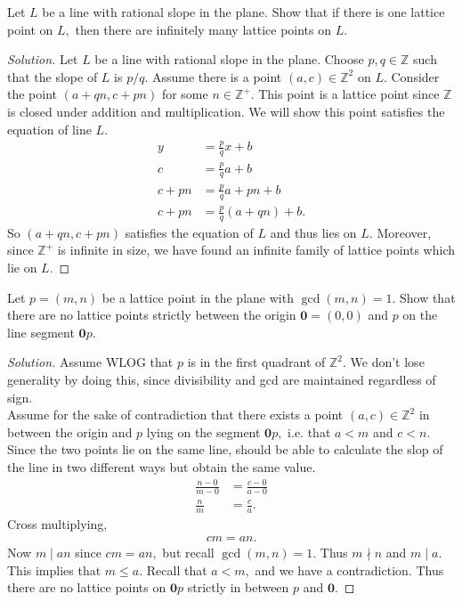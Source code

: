 \documentclass[12pt]{article}
\newcommand{\Z}{\mathbb{Z}}
\newenvironment{exercise}[2][Exercise]{\begin{trivlist}
        \item[\hskip \labelsep {\bfseries #1}\hskip \labelsep {\bfseries #2.}]}{\end{trivlist}}
\newenvironment{solution}
        {\begin{proof}[Solution]}
                    {\end{proof}}
\begin{document}
\begin{exercise}{24}
    Let \( L \) be a line with rational slope in the plane. Show that if there is one lattice point on \( L, \) then there are infinitely many lattice points on \( L. \)
    \begin{solution}
        Let \( L \) be a line with rational slope in the plane. Choose \( p,q \in \Z \) such that the slope of \( L \) is \( p/q. \) Assume there is a point \( (a,c) \in \Z^{2} \) on \( L. \) Consider the point \( ( a + qn, c + pn ) \) for some \( n \in \Z^{+} . \) This point is a lattice point since \( \Z \) is closed under addition and multiplication. We will show this point satisfies the equation of line \( L. \)
        \begin{align*}
            y &= \frac{p}{q} x + b\\[.5ex]
            c &= \frac{p}{q}a + b\\[.5ex]
            c + pn &= \frac{p}{q} a + pn + b\\[.5ex]
            c + pn &= \frac{p}{q} (a + qn) + b.
        \end{align*}
        So \( ( a+qn, c+pn ) \) satisfies the equation of \( L \) and thus lies on \( L. \) Moreover, since \( \Z^{+} \) is infinite in size, we have found an infinite family of lattice points which lie on \( L. \)
    \end{solution}
\end{exercise}

\begin{exercise}{25}
    Let \( p = ( m,n ) \) be a lattice point in the plane with \( \gcd(m,n) = 1. \) Show that there are no lattice points strictly between the origin \( \mathbf{0} = ( 0,0 ) \) and \( p \) on the line segment \( \mathbf{0}p. \)
    \begin{solution}
        Assume WLOG that \( p \) is in the first quadrant of \( \Z^{2} . \) We don't lose generality by doing this, since divisibility and gcd are maintained regardless of sign.\\
        Assume for the sake of contradiction that there exists a point \( ( a,c ) \in \Z^{2} \) in between the origin and \( p \) lying on the segment \( \mathbf{0}p, \) i.e. that \( a < m \) and \( c < n. \) Since the two points lie on the same line, should be able to calculate the slop of the line in two different ways but obtain the same value.
        \begin{align*}
            \frac{n - 0}{m - 0} &= \frac{c - 0}{a - 0}\\
            \frac{n}{m} &= \frac{c}{a} .
        \end{align*}
        Cross multiplying,
        \begin{align*}
            cm = an.
        \end{align*}
        Now \( m \mid an \) since \( cm = an, \) but recall \( \gcd(m,n) = 1. \) Thus \( m \nmid n \) and \( m \mid a. \) This implies that \( m \leq a. \) Recall that \( a < m, \) and we have a contradiction. Thus there are no lattice points on \( \mathbf{0}p \) strictly in between \( p \) and \( \mathbf{0} \).
    \end{solution}
\end{exercise}
\end{document}
